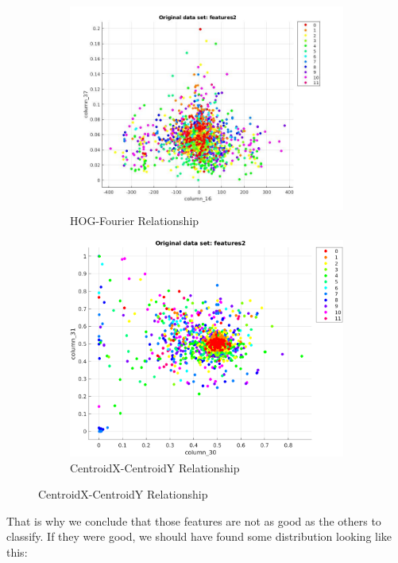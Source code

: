 \documentclass[11]{article}
\begin{document}
\begin{figure}[H]
    \begin{subfigure}[t]{0.45\textwidth}
    \centering
  \includegraphics[scale=0.25]{images/fourierHOGG.jpg}
    \caption{HOG-Fourier Relationship}
    \end{subfigure}
    \begin{subfigure}[t]{0.45\textwidth}
    \centering
    \includegraphics[scale=0.34]{images/centroidXcentroidY.png}
    \caption{CentroidX-CentroidY Relationship}
    \end{subfigure}
\end{figure}

That is why we conclude that those features are not as good as the others to classify. If they were good, we should have found some distribution looking like this: 
\end{document}
